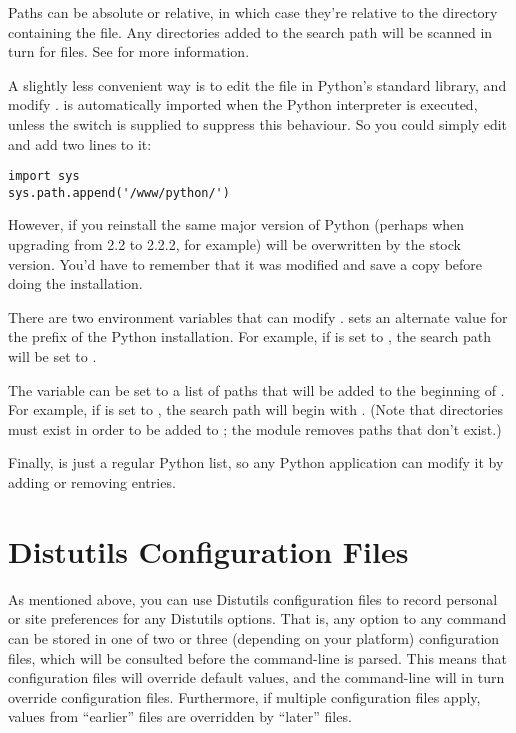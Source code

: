 \documentclass{howto}
\begin{document}
Paths can be absolute or relative, in which case they're relative to
the directory containing the  file.  Any directories added
to the search path will be scanned in turn for  files.  See
 for more information.

A slightly less convenient way is to edit the  file in
Python's standard library, and modify .  
is automatically imported when the Python interpreter is executed,
unless the  switch is supplied to suppress this
behaviour.  So you could simply edit  and add two lines to it:

\begin{verbatim}
import sys
sys.path.append('/www/python/')
\end{verbatim}

However, if you reinstall the same major version of Python (perhaps
when upgrading from 2.2 to 2.2.2, for example)  will be
overwritten by the stock version.  You'd have to remember that it was
modified and save a copy before doing the installation.

There are two environment variables that can modify .
 sets an alternate value for the prefix of the
Python installation.  For example, if  is set to
, the search path will be set to .  

The  variable can be set to a list of paths that
will be added to the beginning of .  For example, if
 is set to , the search
path will begin with .  (Note that
directories must exist in order to be added to ; the
 module removes paths that don't exist.)

Finally,  is just a regular Python list, so any Python
application can modify it by adding or removing entries.


\section{Distutils Configuration Files}
\label{config-files}

As mentioned above, you can use Distutils configuration files to record
personal or site preferences for any Distutils options.  That is, any
option to any command can be stored in one of two or three (depending on
your platform) configuration files, which will be consulted before the
command-line is parsed.  This means that configuration files will
override default values, and the command-line will in turn override
configuration files.  Furthermore, if multiple configuration files
apply, values from ``earlier'' files are overridden by ``later'' files.
\end{document}
